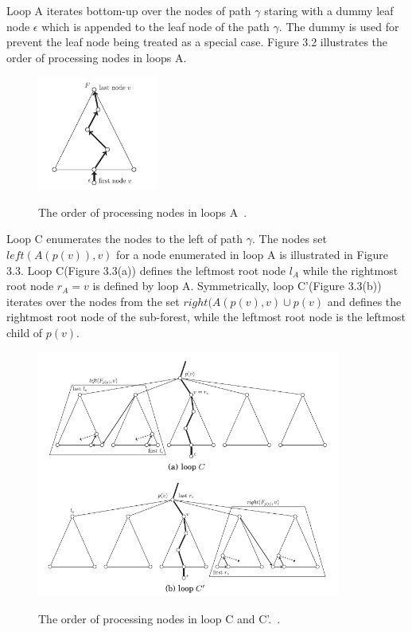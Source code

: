 Loop A iterates bottom-up over the nodes of path $\gamma$ staring with a dummy leaf node $\epsilon$ which is appended to the leaf node of the path $\gamma$. The dummy is used for prevent the leaf node being treated as a special case. Figure 3.2 illustrates the order of processing nodes in loops A.

\begin{figure}
		\centering
		\includegraphics[width=4cm,clip]{Figures/loopA}
		\label{The order of processing nodes in loops A} 
		\caption{The order of processing nodes in loops A~\cite{pawlik2015efficient}.}
\end{figure}

Loop C enumerates the nodes to the left of path $\gamma$. The nodes set $left(A(p(v)), v)$ for a node enumerated in loop A is illustrated in Figure 3.3. Loop C(Figure 3.3(a)) defines the leftmost root node $l_A$ while the rightmost root node $r_A = v$ is defined by loop A. Symmetrically, loop C'(Figure 3.3(b)) iterates over the nodes from the set $right(A(p(v), v) \cup p(v)$ and defines the rightmost root node of the sub-forest, while the leftmost root node is the leftmost child of $p(v)$.

\begin{figure}
		\centering
		\includegraphics[width=10cm,clip]{Figures/loopCC}
		\label{The order of processing nodes in loop C and C'.} 
		\caption{The order of processing nodes in loop C and C'.~\cite{pawlik2015efficient}.}
\end{figure}

